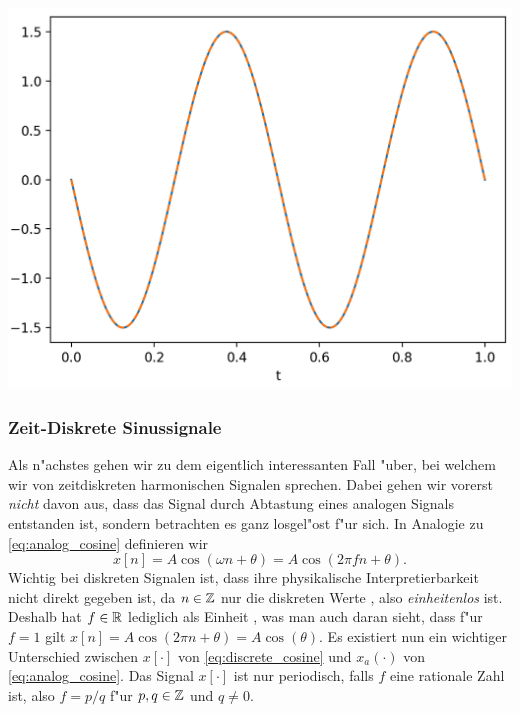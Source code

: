 \begin{listing}
    \begin{minipage}{0.49\textwidth}
        \inputminted[firstline=4]{python3}{code/cont_harms.py}
    \end{minipage}%
    \begin{minipage}{0.49\textwidth}
        \strut\vspace*{-\baselineskip}\newline
        \includegraphics[width=\textwidth]{code/cont_harms.png}
    \end{minipage}
    \label{py:cont_harms}
\end{listing}
\FloatBarrier
%
\subsubsection{Zeit-Diskrete Sinussignale}
%
Als n"achstes gehen wir zu dem eigentlich interessanten Fall "uber, bei welchem wir von zeitdiskreten harmonischen Signalen sprechen.
Dabei gehen wir vorerst \emph{nicht} davon aus, dass das Signal durch Abtastung eines analogen Signals entstanden ist, sondern betrachten es ganz losgel"ost f"ur sich.
In Analogie zu \eqref{eq:analog_cosine} definieren wir
%
\begin{equation}\label{eq:discrete_cosine}
    x[n] = A \cos(\omega n + \theta) = A \cos(2 \pi f n + \theta).
\end{equation}
%
Wichtig bei diskreten Signalen ist, dass ihre physikalische Interpretierbarkeit nicht direkt gegeben ist, da $n \in \mathbb{Z}$ nur die diskreten Werte , also \emph{einheitenlos} ist.
Deshalb hat $f \in \mathbb{R}$ lediglich als Einheit , was man auch daran sieht, dass f"ur $f = 1$ gilt $x[n] = A \cos(2\pi n + \theta) = A \cos(\theta)$.
Es existiert nun ein wichtiger Unterschied zwischen $x[\cdot]$ von \eqref{eq:discrete_cosine} und $x_a(\cdot)$ von \eqref{eq:analog_cosine}.
Das Signal $x[\cdot]$ ist nur periodisch, falls $f$ eine rationale Zahl ist, also $f = p/q$ f"ur $p,q \in \mathbb{Z}$ und $q \neq 0$.


